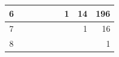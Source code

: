 \begin{table}
\begin{tabular}{|c|rrrrrrrr|}
		6                                                                         & \multicolumn{1}{r|}{}  & \multicolumn{1}{r|}{}  & \multicolumn{1}{r|}{}  & \multicolumn{1}{r|}{}   & \multicolumn{1}{r|}{}   & \multicolumn{1}{r|}{1}   & \multicolumn{1}{r|}{14}   & 196                    \\ \hline
		7                                                                         & \multicolumn{1}{r|}{}  & \multicolumn{1}{r|}{}  & \multicolumn{1}{r|}{}  & \multicolumn{1}{r|}{}   & \multicolumn{1}{r|}{}   & \multicolumn{1}{r|}{}    & \multicolumn{1}{r|}{1}    & 16                     \\ \hline
		8                                                                         & \multicolumn{1}{r|}{}  & \multicolumn{1}{r|}{}  & \multicolumn{1}{r|}{}  & \multicolumn{1}{r|}{}   & \multicolumn{1}{r|}{}   & \multicolumn{1}{r|}{}    & \multicolumn{1}{r|}{}     & 1                      \\ \hline
	\end{tabular}
\end{table}

